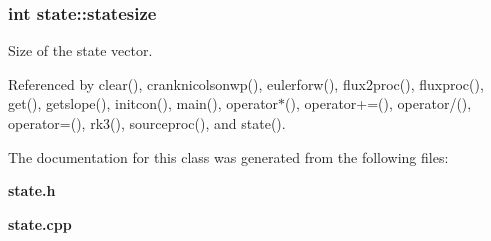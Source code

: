 \subsubsection[{statesize}]{\setlength{\rightskip}{0pt plus 5cm}int state\-::statesize\hspace{0.3cm}{\ttfamily [static]}}\label{classstate_a5360a31f6ea76abdb3308ef67c0fd5c7}


Size of the state vector. 



Referenced by clear(), cranknicolsonwp(), eulerforw(), flux2proc(), fluxproc(), get(), getslope(), initcon(), main(), operator$\ast$(), operator+=(), operator/(), operator=(), rk3(), sourceproc(), and state().



The documentation for this class was generated from the following files\-:\begin{DoxyCompactItemize}
\item 
{\bf state.\-h}\item 
{\bf state.\-cpp}\end{DoxyCompactItemize}
